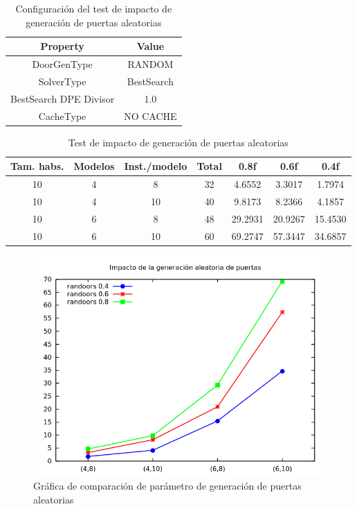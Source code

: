\begin{table}[H]
\begin{center}
	\begin{tabular}{ | c | c | }
\hline
 		Property & Value \\ \hline
DoorGenType & RANDOM \\ 
SolverType & BestSearch \\ 
BestSearch DPE Divisor & 1.0 \\ 
CacheType & NO CACHE \\ 
\hline
	\end{tabular}
\end{center}
\caption{Configuración del test de impacto de generación de puertas aleatorias}
\label{table:cfg-randoors}
\end{table}


\begin{table}[H]
\begin{center}
	\begin{tabular}{ | c | c | c | c | c | c | c | }
\hline
Tam. habs. & Modelos & Inst./modelo & Total & 0.8f & 0.6f & 0.4f \\ \hline 
10 & 4 & 8 & 32 & 4.6552 & 3.3017 & 1.7974 \\ 
10 & 4 & 10 & 40 & 9.8173 & 8.2366 & 4.1857 \\ 
10 & 6 & 8 & 48 & 29.2931 & 20.9267 & 15.4530 \\ 
10 & 6 & 10 & 60 & 69.2747 & 57.3447 & 34.6857 \\ 
\hline
	\end{tabular}
\end{center}
\caption{Test de impacto de generación de puertas aleatorias}
\label{table:randoors}
\end{table}


\begin{figure}[H]
\centering
\includegraphics[scale=0.5]{img/randoors}
\caption{Gráfica de comparación de parámetro de generación de puertas aleatorias
\label{fig:grfrandoors}}
\end{figure}


